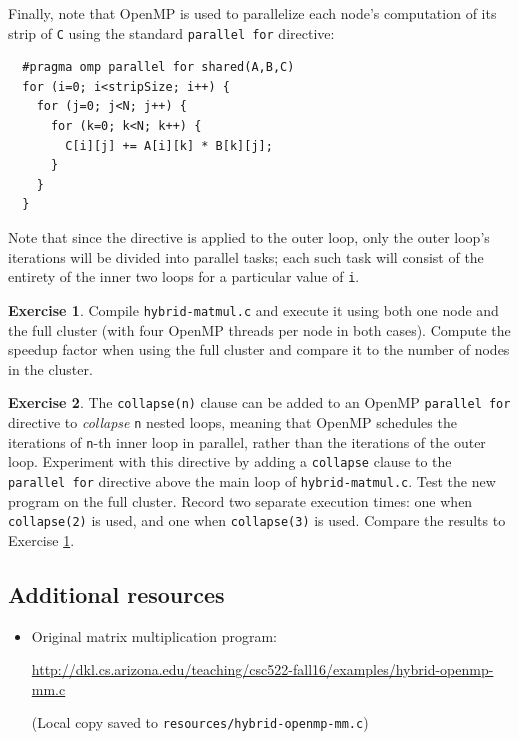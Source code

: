 \documentclass{article}
\newcommand{\resource}[1]{(Local copy saved to \texttt{#1})}
\theoremstyle{definition}
\newtheorem{exercise}{Exercise}
\begin{document}
Finally, note that OpenMP is used to parallelize each node's computation of its strip of \texttt{C} using the standard \texttt{parallel for} directive:

\begin{verbatim}
  #pragma omp parallel for shared(A,B,C)
  for (i=0; i<stripSize; i++) {
    for (j=0; j<N; j++) {
      for (k=0; k<N; k++) {
        C[i][j] += A[i][k] * B[k][j];
      }
    }
  }
\end{verbatim}

Note that since the directive is applied to the outer loop, only the outer loop's iterations will be divided into parallel tasks; each such task will consist of the entirety of the inner two loops for a particular value of \texttt{i}.

\begin{exercise}
\label{ex:hybrid-matmul-1}
Compile \texttt{hybrid-matmul.c} and execute it using both one node and the full cluster (with four OpenMP threads per node in both cases). Compute the speedup factor when using the full cluster and compare it to the number of nodes in the cluster.
\end{exercise}

\begin{exercise}
The \texttt{collapse(n)} clause can be added to an OpenMP \texttt{parallel for} directive to \emph{collapse} \texttt{n} nested loops, meaning that OpenMP schedules the iterations of \texttt{n}-th inner loop in parallel, rather than the iterations of the outer loop. Experiment with this directive by adding a \texttt{collapse} clause to the \texttt{parallel for} directive above the main loop of \texttt{hybrid-matmul.c}. Test the new program on the full cluster. Record two separate execution times: one when \texttt{collapse(2)} is used, and one when \texttt{collapse(3)} is used. Compare the results to Exercise \ref{ex:hybrid-matmul-1}.
\end{exercise}

\subsection*{Additional resources}
\begin{itemize}
    \item Original matrix multiplication program:
    
    \url{http://dkl.cs.arizona.edu/teaching/csc522-fall16/examples/hybrid-openmp-mm.c}
    
     \resource{resources/hybrid-openmp-mm.c}
\end{itemize}
\end{document}
